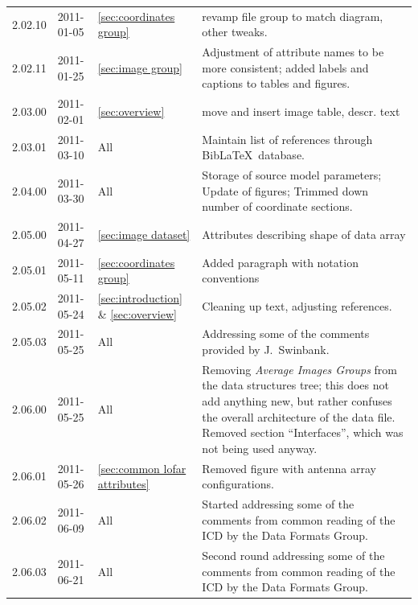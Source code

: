 \documentclass[a4paper,10pt,bibtotoc]{scrartcl}
\begin{document}
\begin{center}
\begin{supertabular}{lllp{9.5cm}}
    2.02.10 & 2011-01-05 & \ref{sec:coordinates group} & revamp file
    group to match diagram, other tweaks. \\

    2.02.11 & 2011-01-25 & \ref{sec:image group} & Adjustment of attribute names
    to be more consistent; added labels and captions to tables and figures. \\

    2.03.00 & 2011-02-01 & \ref{sec:overview} & move and insert image table,
    descr. text \\

    2.03.01 & 2011-03-10 & All & Maintain list of references
    through Bib\LaTeX\ database. \\

    2.04.00 & 2011-03-30 & All & Storage of source model parameters; Update of
    figures; Trimmed down number of coordinate sections. \\

    2.05.00 & 2011-04-27 & \ref{sec:image dataset} & Attributes describing shape
    of data array \\

    2.05.01 & 2011-05-11 & \ref{sec:coordinates group} & Added paragraph with
    notation conventions \\

    2.05.02 & 2011-05-24 & \ref{sec:introduction} \& \ref{sec:overview} & Cleaning
    up text, adjusting references. \\

    2.05.03 & 2011-05-25 & All & Addressing some of the comments provided by
    J.~Swinbank. \\

    2.06.00 & 2011-05-25 & All & Removing \textsl{Average Images Groups} from
    the data structures tree; this does not add anything new, but rather confuses
    the overall architecture of the data file. Removed section ``Interfaces'',
    which was not being used anyway. \\

    2.06.01 & 2011-05-26 & \ref{sec:common lofar attributes} & Removed figure
    with antenna array configurations. \\

    2.06.02 & 2011-06-09 & All & Started addressing some of the
    comments from common reading of the ICD by the Data Formats Group. \\

    2.06.03 & 2011-06-21 & All & Second round addressing some of the
    comments from common reading of the ICD by the Data Formats Group. \\


\end{supertabular}
\end{center}
\end{document}

